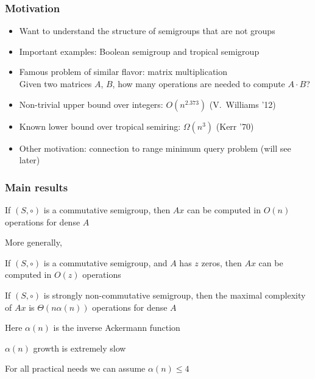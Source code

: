 \documentclass{beamer}
\begin{document}
\begin{frame}
\frametitle{Motivation}

\begin{itemize}[<+->]
\item Want to understand the structure of semigroups that are not groups
\item Important examples: Boolean semigroup and tropical semigroup
\item Famous problem of similar flavor: matrix multiplication \\
Given two matrices $A$, $B$, how many operations are needed to compute $A\cdot B$?
\item Non-trivial upper bound over integers: $O(n^{2.373})$ (V.~Williams '12)
\item Known lower bound over tropical semiring: $\Omega(n^3)$ (Kerr '70)
\item Other motivation: connection to range minimum query problem (will see later)
\end{itemize}


\end{frame}


\begin{frame}
\frametitle{Main results}

\begin{theorem}
If $(S,\circ)$ is a commutative semigroup, then $Ax$ can be computed in $O(n)$ operations for dense $A$
\end{theorem}

\pause

\medskip
More generally,
\vspace{-2mm}
\begin{theorem}
If $(S,\circ)$ is a commutative semigroup, and $A$ has $z$ zeros, then $Ax$ can be computed in $O(z)$ operations
\end{theorem}

\pause

\begin{theorem}
If $(S,\circ)$ is strongly non-commutative semigroup, then the maximal complexity of $Ax$ is $\Theta(n\alpha(n))$ operations for dense $A$
\end{theorem}

\medskip
Here $\alpha(n)$ is the inverse Ackermann function

\pause
\medskip
$\alpha(n)$ growth is extremely slow

\medskip
For all practical needs we can assume $\alpha(n)\leq 4$

\end{frame}
\end{document}
